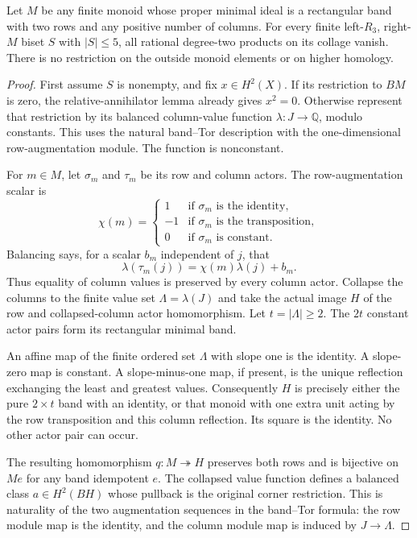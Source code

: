\begin{theorem}
\label{CP2:A-two-row-band-five-state-right-zero}
Let $M$ be any finite monoid whose proper minimal ideal is a
rectangular band with two rows and any positive number of columns.
For every finite left-$R_3$, right-$M$ biset $S$ with $|S|\le5$,
all rational degree-two products on its collage vanish.
There is no restriction on the outside monoid elements or on
higher homology.
\end{theorem}
\begin{proof}
First assume $S$ is nonempty, and fix $x\in H^2(X)$.  If its
restriction to $BM$ is zero, the relative-annihilator lemma already
gives $x^2=0$.  Otherwise represent that restriction by its balanced
column-value function $\lambda:J\to\mathbb Q$, modulo constants.
This uses the natural band--Tor description with the one-dimensional
row-augmentation module.  The function is nonconstant.

For $m\in M$, let $\sigma_m$ and $\tau_m$ be its row and column
actors.  The row-augmentation scalar is
\[
 \chi(m)=\begin{cases}
 1&\text{if }\sigma_m\text{ is the identity},\\
 -1&\text{if }\sigma_m\text{ is the transposition},\\
 0&\text{if }\sigma_m\text{ is constant}.
 \end{cases}
\]
Balancing says, for a scalar $b_m$ independent of $j$, that
\[
 \lambda(\tau_m(j))=\chi(m)\lambda(j)+b_m.
\]
Thus equality of column values is preserved by every column actor.
Collapse the columns to the finite value set
$\Lambda=\lambda(J)$ and take the actual image $H$ of the row and
collapsed-column actor homomorphism.  Let $t=|\Lambda|\ge2$.
The $2t$ constant actor pairs form its rectangular minimal band.

An affine map of the finite ordered set $\Lambda$ with slope one
is the identity.  A slope-zero map is constant.  A slope-minus-one
map, if present, is the unique reflection exchanging the least and
greatest values.  Consequently $H$ is precisely either the pure
$2\times t$ band with an identity, or that monoid with one extra
unit acting by the row transposition and this column reflection.
Its square is the identity.  No other actor pair can occur.

The resulting homomorphism $q:M\twoheadrightarrow H$ preserves
both rows and is bijective on $Me$ for any band idempotent $e$.
The collapsed value function defines a balanced class
$a\in H^2(BH)$ whose pullback is the original corner restriction.
This is naturality of the two augmentation sequences in the
band--Tor formula: the row module map is the identity, and the
column module map is induced by $J\to\Lambda$.


\end{proof}

